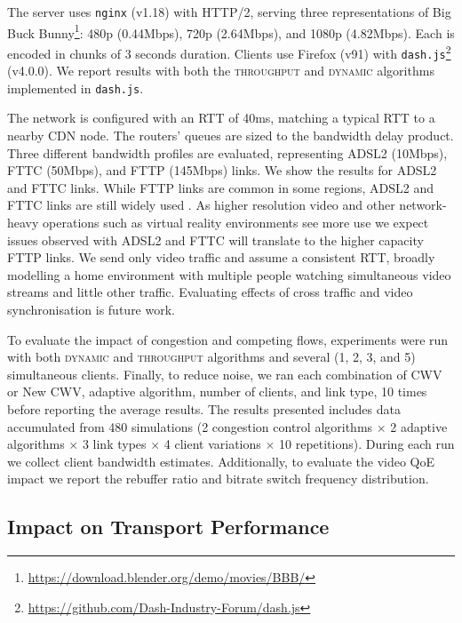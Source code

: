\documentclass[10pt,sigconf]{acmart}
\begin{document}
The server uses \texttt{nginx} (v1.18) with HTTP/2, serving three representations of Big Buck Bunny\footnote{\url{https://download.blender.org/demo/movies/BBB/}}: 480p (0.44Mbps), 720p (2.64Mbps), and 1080p (4.82Mbps). Each is encoded in chunks of 3 seconds duration.
Clients use Firefox (v91) with \texttt{dash.js}\footnote{\url{https://github.com/Dash-Industry-Forum/dash.js}} (v4.0.0). We
report results with both the \textsc{throughput} and \textsc{dynamic} \cite{Spiteri-2019-from-theory-to-practice-sabre} algorithms implemented in \texttt{dash.js}.

The network is configured with an RTT of 40ms, matching a typical RTT to a nearby CDN node. The routers' queues are sized to the bandwidth delay product. Three different bandwidth profiles are evaluated, representing ADSL2 (10Mbps), FTTC (50Mbps), and FTTP (145Mbps) links. We show the results for ADSL2 and FTTC links.
While FTTP links are common in some regions, ADSL2 and FTTC links are still widely used \cite{ofcom-2020-report,FCC-measuring-broadband-america,EC-measuring-broadband-europe,ACCC-measuring-broadband-australia}. As higher resolution video and other network-heavy operations such as virtual reality environments see more use we expect issues observed with ADSL2 and FTTC will translate to the higher capacity FTTP links.
We send only video traffic and assume a consistent RTT, broadly modelling a home environment with multiple people watching simultaneous video streams and little other traffic. Evaluating effects of cross traffic and video synchronisation is future work.

To evaluate the impact of congestion and competing flows, experiments were run with both \textsc{dynamic} and \textsc{throughput} algorithms and several (1, 2, 3, and 5) simultaneous clients. Finally, to reduce noise, we ran each combination of CWV or New CWV, adaptive algorithm, number of clients, and link type, 10 times before reporting the average results. The results presented includes data accumulated from 480 simulations (2 congestion control algorithms $\times$ 2 adaptive algorithms $\times$ 3 link types $\times$ 4 client variations $\times$ 10 repetitions). 
During each run we collect client bandwidth estimates. Additionally, to evaluate the video QoE impact we report the rebuffer ratio and bitrate switch frequency distribution.

\subsection{Impact on Transport Performance} 
\label{sec:transport-impact}
\end{document}
